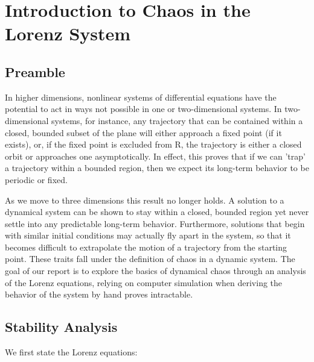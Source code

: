 \documentclass{report}
\begin{document}
\chapter{Introduction to Chaos in the Lorenz System}
\section{Preamble}
In higher dimensions, nonlinear systems of differential equations have the
potential to act in ways not possible in one or two-dimensional systems. In 
two-dimensional systems, for instance, any trajectory that can be contained within a closed, bounded subset of the plane will either approach a fixed point
(if it exists), or, if the fixed point is excluded from R, the trajectory is
either a closed orbit or approaches one asymptotically. In effect, this proves
that if we can 'trap' a trajectory within a bounded region, then we expect its 
long-term behavior to be periodic or fixed.
	
As we move to three dimensions this result no longer holds. A solution to a
dynamical system can be shown to stay within a closed, bounded region yet
never settle into any predictable long-term behavior. Furthermore, solutions 
that begin with similar initial conditions may actually fly apart in the 
system, so that it becomes difficult to extrapolate the motion of a trajectory 
from the starting point. These traits fall under the definition of chaos in a
dynamic system. The goal of our report is to explore the basics of dynamical 
chaos through an analysis of the Lorenz equations, relying on computer
simulation when deriving the behavior of the system by hand proves intractable.

\section{Stability Analysis}

We first state the Lorenz equations:
\end{document}
